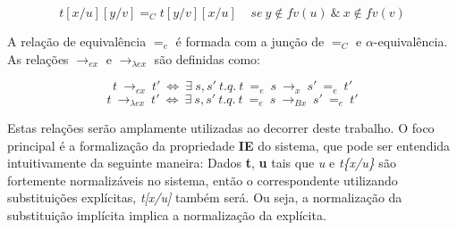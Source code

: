 \[ t[x/u][y/v] =_C t[y/v][x/u] \ \ \ \ \ se\ y \notin fv(u)\ \&\ x \notin fv(v)\] 

A relação de equivalência $=_e$ é formada com a junção de $=_C$ e
$\alpha$-equivalência. As relações $\rightarrow_{ex}$ e $\rightarrow_{\lambda
    ex}$ são definidas como:

\[t\ \rightarrow_{ex}\ t'\ \iff\ \exists\ s,s'\ t.q.\ t\ =_{e}\ s\
    \rightarrow_x\ s'\ =_e\ t' \]
\[t\ \rightarrow_{\lambda ex}\ t'\ \iff\ \exists\ s,s'\ t.q.\ t\ =_{e}\ s\
    \rightarrow_{Bx}\ s'\ =_e\ t' \]

Estas relações serão amplamente utilizadas ao decorrer deste trabalho. 
O foco principal é a formalização da propriedade \textbf{IE} do sistema, que
pode ser entendida intuitivamente da seguinte maneira: Dados \textbf{t},
\textbf{u} tais que \emph{u} e \emph{t\{x/u\}} são fortemente normalizáveis
no sistema, então o correspondente utilizando substituições explícitas,
\emph{t[x/u]} também será. Ou seja, a normalização da substituição implícita
implica a normalização da explícita.


